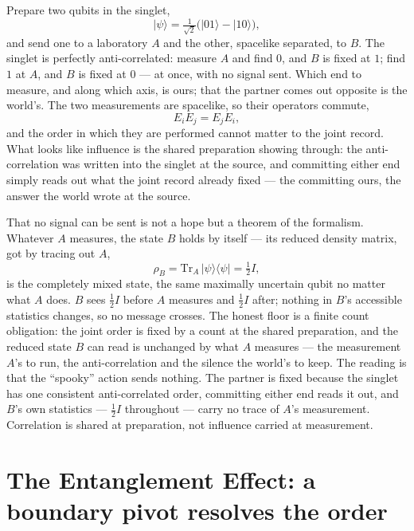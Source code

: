 Prepare two qubits in the singlet,
\begin{equation}
  \lvert\psi\rangle = \tfrac{1}{\sqrt2}\bigl(\lvert 01\rangle - \lvert 10\rangle\bigr),
\end{equation}
and send one to a laboratory $A$ and the other, spacelike separated, to $B$. The singlet is perfectly
anti-correlated: measure $A$ and find $0$, and $B$ is fixed at $1$; find $1$ at $A$, and $B$ is fixed at $0$
--- at once, with no signal sent. Which end to measure, and along which axis, is ours; that the partner comes
out opposite is the world's. The two measurements are spacelike, so their operators commute,
\begin{equation}
  E_i E_j = E_j E_i,
\end{equation}
and the order in which they are performed cannot matter to the joint record. What looks like influence is the
shared preparation showing through: the anti-correlation was written into the singlet at the source, and
committing either end simply reads out what the joint record already fixed --- the committing ours, the answer
the world wrote at the source.

That no signal can be sent is not a hope but a theorem of the formalism. Whatever $A$ measures, the
state $B$ holds by itself --- its reduced density matrix, got by tracing out $A$,
\begin{equation}
  \rho_B = \mathrm{Tr}_A\,\lvert\psi\rangle\langle\psi\rvert = \tfrac12 I,
\end{equation}
is the completely mixed state, the same maximally uncertain qubit no matter what $A$ does. $B$ sees $\tfrac12
I$ before $A$ measures and $\tfrac12 I$ after; nothing in $B$'s accessible statistics changes, so no message
crosses. The honest floor is a finite count obligation: the joint order is fixed by a count at the shared
preparation, and the reduced state $B$ can read is unchanged by what $A$ measures --- the measurement $A$'s to
run, the anti-correlation and the silence the world's to keep. The reading is that the
``spooky'' action sends nothing. The partner is fixed because the singlet has one consistent anti-correlated
order, committing either end reads it out, and $B$'s own statistics --- $\tfrac12 I$ throughout --- carry no
trace of $A$'s measurement. Correlation is shared at preparation, not influence carried at measurement.

\section{The Entanglement Effect: a boundary pivot resolves the order}
\label{se:entanglement}


